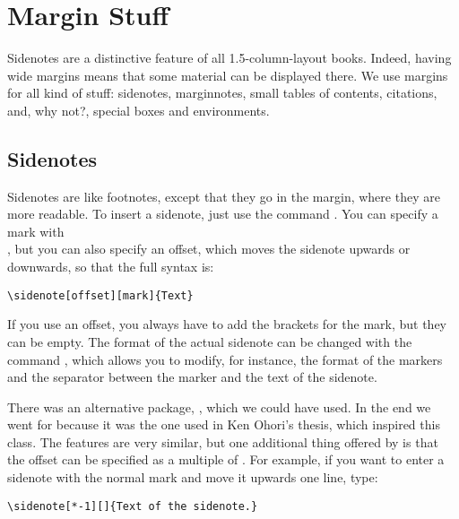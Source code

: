 \setchapterpreamble[u]{\margintoc}
\chapter{Margin Stuff}

Sidenotes are a distinctive feature of all 1.5-column-layout books. 
Indeed, having wide margins means that some material can be displayed 
there. We use margins for all kind of stuff: sidenotes, marginnotes, 
small tables of contents, citations, and, why not?, special boxes and 
environments.

\section{Sidenotes}

Sidenotes are like footnotes, except that they go in the margin, where 
they are more readable. To insert a sidenote, just use the command 
. You can specify a 
mark with \\ 
, but you can also specify an offset, 
which moves the sidenote upwards or downwards, so that the full syntax is:

\begin{lstlisting}[style=kaolstplain]
\sidenote[offset][mark]{Text}
\end{lstlisting}

If you use an offset, you always have to add the 
brackets for the mark, but they can be empty. The format of the actual 
sidenote can be changed with the command , which 
allows you to modify, for instance, the format of the markers and the 
separator between the marker and the text of the sidenote.

There was an alternative package, , which we could 
have used. In the end we went for  because it was the 
one used in Ken Ohori's thesis, which inspired this class. The features 
are very similar, but one additional thing offered by  
is that the offset can be specified as a multiple of 
. For example, if you want to enter a sidenote 
with the normal mark and move it upwards one line, type:

\begin{lstlisting}[style=kaolstplain]
\sidenote[*-1][]{Text of the sidenote.}
\end{lstlisting}

